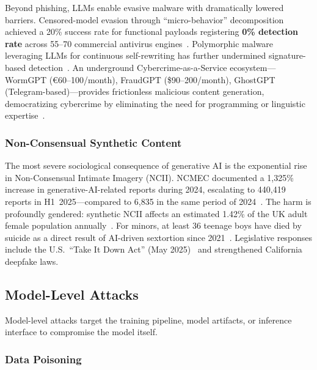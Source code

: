 Beyond phishing, LLMs enable evasive malware with dramatically lowered barriers. Censored-model evasion through ``micro-behavior'' decomposition achieved a 20\% success rate for functional payloads registering \textbf{0\% detection rate} across 55--70 commercial antivirus engines~\cite{mdpi2025malware}. Polymorphic malware leveraging LLMs for continuous self-rewriting has further undermined signature-based detection~\cite{crowdstrike2025ransomware}. An underground Cybercrime-as-a-Service ecosystem---WormGPT (\euro60--100/month), FraudGPT (\$90--200/month), GhostGPT (Telegram-based)---provides frictionless malicious content generation, democratizing cybercrime by eliminating the need for programming or linguistic expertise~\cite{levelblue2023wormgpt}.


\subsubsection{Non-Consensual Synthetic Content}
\label{sec:threat-ncii}

The most severe sociological consequence of generative AI is the exponential rise in Non-Consensual Intimate Imagery (NCII). NCMEC documented a 1,325\% increase in generative-AI-related reports during 2024, escalating to 440,419 reports in H1~2025---compared to 6,835 in the same period of 2024~\cite{ncmec2025}. The harm is profoundly gendered: synthetic NCII affects an estimated 1.42\% of the UK adult female population annually~\cite{swgfl2025}. For minors, at least 36 teenage boys have died by suicide as a direct result of AI-driven sextortion since 2021~\cite{ncmec2025}. Legislative responses include the U.S.\ ``Take It Down Act'' (May 2025)~\cite{takeitdown2025} and strengthened California deepfake laws.


\subsection{Model-Level Attacks}
\label{sec:threat-model}

Model-level attacks target the training pipeline, model artifacts, or inference interface to compromise the model itself.

\subsubsection{Data Poisoning}
\label{sec:threat-poisoning}

